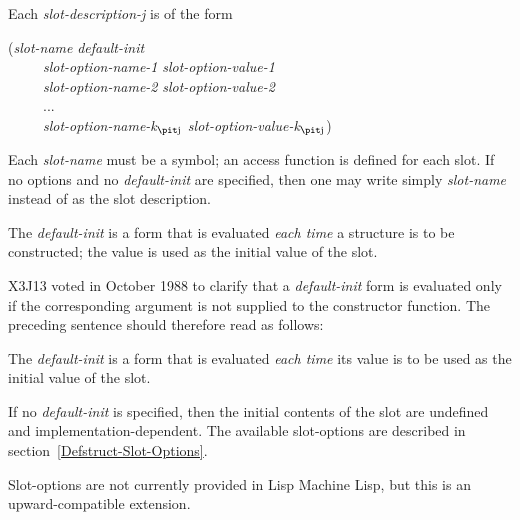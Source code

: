 \begin{defmac}
Each {\it slot-description-j} is of the form
\begin{lisp}
({\it slot-name} {\it default-init} \\
~~~~~{\it slot-option-name-1} {\it slot-option-value-1} \\
~~~~~{\it slot-option-name-2} {\it slot-option-value-2} \\
~~~~~... \\
~~~~~{\it slot-option-name-k${}_{\hbox{\scriptsize\it j}}$} {\it slot-option-value-k${}_{\hbox{\scriptsize\it j}}$})
\end{lisp}
Each {\it slot-name} must be a symbol; an access function is defined
for each slot. If no options and no {\it default-init} are specified,
then one may write simply {\it slot-name} instead of 
as the slot description.

\begin{obsolete}
The {\it default-init} is a form that is
evaluated {\it each time} a structure is to be constructed; the value
is used as the initial value of the slot.
\end{obsolete}

\begin{newer}
X3J13 voted in October 1988 
to clarify that a {\it default-init} form is evaluated only if the corresponding
argument is not supplied to the constructor function.  The preceding
sentence should therefore read as follows:

The {\it default-init} is a form that is
evaluated {\it each time} its value
is to be used as the initial value of the slot.
\end{newer}
If no {\it default-init}
is specified, then the initial contents of the slot are undefined
and implementation-dependent.  The available slot-options are
described in section~\ref{Defstruct-Slot-Options}.

\beforenoterule
\begin{incompatibility}
Slot-options are not currently provided
in Lisp Machine Lisp, but this is an upward-compatible extension.
\end{incompatibility}
\afternoterule


\end{defmac}
